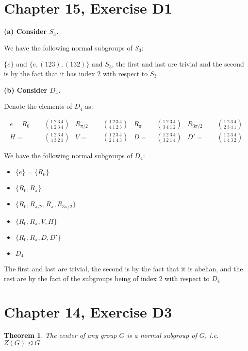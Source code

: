 \documentclass[12pt]{article}
\newtheorem{thm}{Theorem}
\begin{document}
\section{Chapter 15, Exercise D1}

\textbf{(a) Consider $S_3$.}

We have the following normal subgroups of $S_3$:

$\{e\}$ and $\{e, (123), (132) \}$ and $S_3$,
the first and last are trivial and the second
is by the fact that it has index $2$ with respect to $S_3$.

\textbf{(b) Consider $D_4$.}

Denote the elements of $D_4$ as:

\begin{align}
	\label{topperm}
	e = R_0 = & \binom{1\ 2\ 3\ 4}{1\ 2\ 3\ 4} &
	R_{\pi/2} = & \binom{1\ 2\ 3\ 4}{4\ 1\ 2\ 3} &
	R_{\pi} = & \binom{1\ 2\ 3\ 4}{3\ 4\ 1\ 2} &
	R_{3\pi/2} = & \binom{1\ 2\ 3\ 4}{2\ 3\ 4\ 1} \\
	\label{botperm}
	H  = & \binom{1\ 2\ 3\ 4}{4\ 3\ 2\ 1} &
	V  = & \binom{1\ 2\ 3\ 4}{2\ 1\ 4\ 3} &
	D = & \binom{1\ 2\ 3\ 4}{3\ 2\ 1\ 4} &
	D' = & \binom{1\ 2\ 3\ 4}{1\ 4\ 3\ 2}
\end{align}

We have the following normal subgroups of $D_4$:

\begin{itemize}
	\item $\{e\} = \{R_0\}$ 
	\item $\{R_0, R_\pi \}$ 
	\item $\{R_0, R_{\pi/2}, R_{\pi}, R_{3\pi/2} \}$ 
	\item $\{R_0, R_\pi, V, H\}$
	\item $\{R_0, R_\pi, D, D' \}$
	\item $D_4$
\end{itemize}

The first and last are trivial,
the second is by the fact that it is abelian,
and the rest are by the fact of the subgroups being of index $2$
with respect to $D_4$

\section{Chapter 14, Exercise D3}

\begin{thm} \label{thm5}
	The center of any group $G$ is a normal subgroup of $G$,
	i.e. $Z(G) \trianglelefteq G$
\end{thm}
\end{document}
